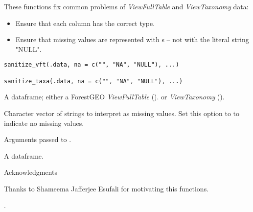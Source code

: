\documentclass[a4paper]{book}
\begin{document}
%
\begin{Description}\relax
These functions fix common problems of \emph{ViewFullTable} and \emph{ViewTaxonomy}
data:
\begin{itemize}

\item Ensure that each column has the correct type.
\item Ensure that missing values are represented with s -- not with the
literal string "NULL".

\end{itemize}

\end{Description}
%
\begin{Usage}
\begin{verbatim}
sanitize_vft(.data, na = c("", "NA", "NULL"), ...)

sanitize_taxa(.data, na = c("", "NA", "NULL"), ...)
\end{verbatim}
\end{Usage}
%
\begin{Arguments}
\begin{ldescription}
\item[\code{.data}] A dataframe; either a ForestGEO \emph{ViewFullTable}
().
or \emph{ViewTaxonomy} ().

\item[\code{na}] Character vector of strings to interpret as missing values. Set this
option to  to indicate no missing values.

\item[\code{...}] Arguments passed to .
\end{ldescription}
\end{Arguments}
%
\begin{Value}
A dataframe.
\end{Value}
%
\begin{Section}{Acknowledgments}

Thanks to Shameema Jafferjee Esufali for motivating this functions.
\end{Section}
%
\begin{SeeAlso}\relax
{}.
\end{SeeAlso}
\end{document}
